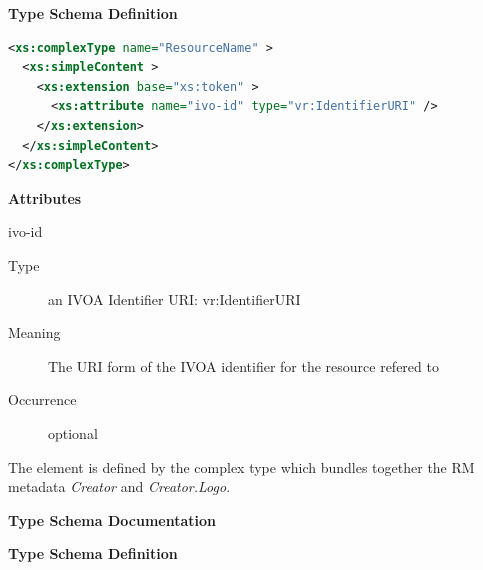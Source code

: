 \documentclass[11pt,a4paper]{ivoa}
\begin{document}

\vspace{1ex}\noindent\textbf{ Type Schema Definition}

\begin{lstlisting}[language=XML,basicstyle=\footnotesize]
<xs:complexType name="ResourceName" >
  <xs:simpleContent >
    <xs:extension base="xs:token" >
      <xs:attribute name="ivo-id" type="vr:IdentifierURI" />
    </xs:extension>
  </xs:simpleContent>
</xs:complexType>
\end{lstlisting}

\vspace{0.5ex}\noindent\textbf{ Attributes}

\begingroup\small\begin{bigdescription}
\item[ivo-id]
\begin{description}
\item[Type] an IVOA Identifier URI: vr:IdentifierURI
\item[Meaning] 
                The URI form of the IVOA identifier for the resource refered to
              
\item[Occurrence] optional

\end{description}


\end{bigdescription}\endgroup

\endgroup


The  element is defined by the  complex
type which bundles together the RM metadata \emph{Creator} and
\emph{Creator.Logo}.



\begingroup
      	\renewcommand*\descriptionlabel[1]{%
      	\hbox to 5.5em{\emph{#1}\hfil}}\vspace{2ex}\noindent\textbf{ Type Schema Documentation}


\vspace{1ex}\noindent\textbf{ Type Schema Definition}
\end{document}

